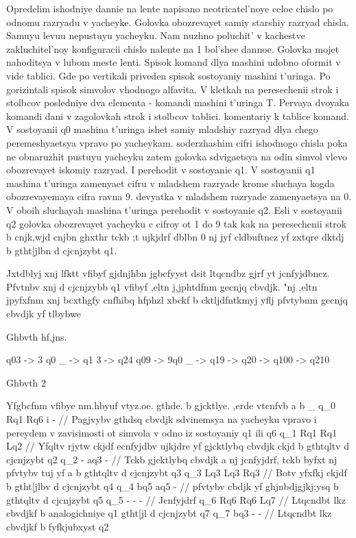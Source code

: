 Opredelim ishodniye dannie na lente napisano neotricatel'noye celoe chislo po odnomu razryadu v yacheyke.
Golovka obozrevayet samiy starshiy razryad chisla.
Samuyu levuu nepustuyu yacheyku.
Nam nuzhno poluchit' v kachestve zakluchitel'noy konfiguracii chislo nalente na 1 bol'shee dannoe.
Golovka mojet nahoditsya v lubom meste lenti.
Spisok komand dlya mashini udobno oformit v vide tablici.
Gde po vertikali priveden spisok sostoyaniy mashini t'uringa. 
Po gorizintali spisok simvolov vhodnogo alfavita.
V kletkah na peresechenii strok i stolbcov posledniye dva elementa - komandi mashini t'uringa T.
Pervaya dvoyaka komandi dani v zagolovkah strok i stolbcov tablici.
komentariy k tablice komand. V sostoyanii q0 mashina t'uringa ishet samiy mladshiy razryad dlya chego peremeshyaetsya vpravo po yacheykam.
soderzhashim cifri ishodnogo chisla poka ne obnaruzhit pustuyu yacheyku
zatem golovka sdvigaetsya na odin simvol vlevo obozrevayet iskomiy razryad. I perehodit v sostoyanie q1. V sostoyanii q1 mashina t'uringa zamenyaet cifru v mladshem razryade krome sluchaya kogda obozrevayemaya cifra ravna 9. devyatka v mladshem razryade zamenyaetsya na 0. V oboih sluchayah mashina t'uringa perehodit v sostoyanie q2. Esli v sostoyanii q2 golovka obozrevayet yacheyku c cifroy ot 1 do 9 tak kak na peresechenii strok b cnjk,wjd cnjbn ghxthr tckb ;t ujkjdrf dblbn 0 nj jyf cldbuftncz yf zxtqre dktdj b gtht[jlbn d cjcnjzybt q1.






Jxtdblyj xnj lfktt vfibyf gjdnjhbn jgbcfyyst dsit ltqcndbz gjrf yt jcnfyjdbncz. Pfvtnbv xnj d cjcnjzybb q1 vfibyf ,eltn j,jphtdfnm gecnjq cbvdjk. "nj ,eltn jpyfxfnm xnj bcxthgfy cnfhibq hfphzl xbckf b cktljdfntkmyj yflj pfvtybnm gecnjq cbvdjk yf tlbybwe 

Ghbvth hf,jns.

q03 -> 3 q0 _ -> q1 3 -> q24 
q09 -> 9q0 _ -> q19 -> q20 -> q100  -> q210

Ghbvth 2

Yfgbcfnm vfibye nm.hbyuf vtyz.oe. gthde. b gjcktlye. ,erde vtcnfvb
	 a  b   _
q_0  Rq1  Rq6 i - // Pagjvybv gthdsq cbvdjk sdvinemsya na yacheyku vpravo i pereydem v zavisimosti ot simvola v odno iz sostoyaniy q1 ili q6
q_1  Rq1 Rq1 Lq2  // Yfqltv rjytw ckjdf ecnfyjdbv ujkjdre yf gjcktlybq cbvdjk ckjd b gthtqltv d cjcnjzybt q2
q_2  -   aq3 -    // Tckb gjcktlybq cbvdjk a nj jcnfyjdrf, tckb byfxt nj pfvtybv tuj yf a b gthtqltv d cjcnjzybt q3 
q_3  Lq3 Lq3 Rq3  // Botv yfxfkj ckjdf b gtht[jlbv d cjcnjzybt q4
q_4  bq5 aq5  -   // pfvtybv cbdjk yf ghjnbdjgjkj;ysq b gthtqltv d cjcnjzybt q5
q_5  -   -   -    // Jcnfyjdrf
q_6  Rq6 Rq6 Lq7  // Ltqcndbt lkz cbvdjkf b analogichniye q1 gtht[jl d cjcnjzybt q7
q_7  bq3 -   -     // Ltqcndbt lkz cbvdjkf b fyfkjubxyst q2

